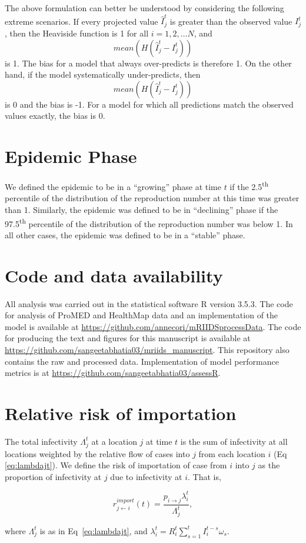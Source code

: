 \documentclass[9pt,twocolumn,twoside,lineno]{pnas-new}
\begin{document}
{The above formulation can better be understood by considering the
following extreme scenarios. If every projected value
$\hat{I}_{j}^{t}$ is greater than the observed value
$I_{j}^{t}$, then the Heaviside function is 1 for all $i = 1, 2,
\dots N$, and 
\[ mean\left( H \left( \hat{I}_{j}^{t} - I_j^t \right) \right) \]
is 1. The bias for a model that always over-predicts
is therefore 1. On the other hand, if the model systematically
under-predicts, then
\[ mean\left( H \left( \hat{I}_{j}^{t} - I_j^t \right) \right) \]
is 0 and the bias is -1. For a model for which all
predictions match the observed values exactly, the bias is 0.

\section*{Epidemic Phase}
We defined the epidemic to be in a ``growing'' phase at time $t$ if the 
2.5\textsuperscript{th} percentile of the distribution of the reproduction
number at this time was greater than 1. Similarly, the epidemic was
defined to be in ``declining'' phase if the 97.5\textsuperscript{th} 
percentile of the distribution of the reproduction number was below
1. In all other cases, the epidemic was defined to be in a ``stable'' phase.

\section*{Code and data availability}
All analysis was carried out in the statistical software R version
3.5.3. The code for analysis of ProMED and HealthMap data and an
implementation of the model is available at
\url{https://github.com/annecori/mRIIDSprocessData}. The code for
producing the text and figures for this manuscript is available at
\url{https://github.com/sangeetabhatia03/mriids_manuscript}. This
repository also contains the raw and processed data. Implementation
of model performance metrics is at
\url{https://github.com/sangeetabhatia03/assessR}.

\section*{Relative risk of
  importation}\label{relative-risk-of-importation}

The total infectivity $\Lambda_{j}^{t}$ at a location $j$ at time $t$ is the sum of
infectivity at all locations weighted by the relative flow of cases
into $j$ from each location $i$ (Eq \ref{eq:lambdajt}). We define the risk of
importation of case from $i$ into $j$ as the proportion of infectivity
at $j$ due to infectivity at $i$. That is, 

\begin{equation*}
r_{j \leftarrow i}^{import}(t) = \frac{p_{i \rightarrow j}\lambda_i^t}{\Lambda_j^t},
\end{equation*}

where $\Lambda_j^t$ is as in Eq~\ref{eq:lambdajt}, and
$\lambda_i^t = R_{i}^{t} \sum\limits_{s =1}^{t} {I_{i}^{t - s}\omega_{s}}$.

} %
\end{document}
